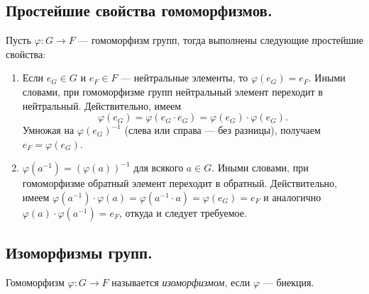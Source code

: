 \subsection{Простейшие свойства гомоморфизмов.}

 \hspace{0.3cm} Пусть $\varphi: G \to F$ --- гомоморфизм групп, 
 тогда выполнены следующие простейшие свойства:
 \vspace{-0.3cm}
 \begin{enumerate}[label=\arabic*)]
     \item Если $e_G \in G$ и $e_F \in F$ --- нейтральные элементы,
     то $\varphi(e_G) = e_F$. Иными словами,
     при гомоморфизме групп нейтральный элемент переходит в нейтральный.
     Действительно, имеем
     \[
         \varphi(e_G) = \varphi(e_G \cdot e_G) = \varphi(e_G) \cdot \varphi(e_G).
     \]
     Умножая на $\varphi(e_G)^{-1}$ (слева или справа --- без разницы), 
     получаем $e_F = \varphi(e_G)$.
     \item $\varphi(a^{-1}) = \left( \varphi(a) \right)^{-1}$ для всякого $a \in G$.
     Иными словами, при гомоморфизме обратный элемент переходит в обратный.
     Действительно, имеем 
     $\varphi(a^{-1}) \cdot \varphi(a) = \varphi(a^{-1} \cdot a) = \varphi(e_G) = e_F$
     и аналогично $\varphi(a) \cdot \varphi(a^{-1}) = e_F$, откуда и следует требуемое.
 \end{enumerate}

\subsection{Изоморфизмы групп.}

\begin{definition}
    Гомоморфизм $\varphi: G \to F$ называется \textit{изоморфизмом}, если $\varphi$ --- биекция.
\end{definition}

\begin{comment}
    Если $\varphi: G \to F$ --- изоморфизм, то обратное отображение $\varphi^{-1}: F \to G$ --- 
    тоже изоморфизм. Обратное отображение сохраняет биективность, остается проверить на гомоморфизм:
    пусть $\varphi(a) = a'$ и $\varphi(b) = b'$, тогда получаем
    \[
       \varphi^{-1}(a'b') = \varphi^{-1}(\varphi(a) \cdot \varphi(b)) = 
       \underbrace{\varphi^{-1}(\varphi}_{Id}(ab)) = ab = \varphi^{-1}(a') \cdot \varphi^{-1}(b')
    \]
    получили, что $\varphi^{-1}$ --- это биекция и гомоморфизм $\To$ изоморфизм.
\end{comment}

